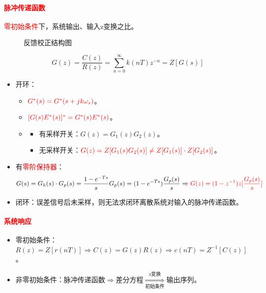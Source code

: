 \documentclass[
12pt, %
a4paper, 
oneside, %
]{scrartcl}
\begin{document}
\paragraph{\textcolor{red}{脉冲传递函数}}
\textcolor{red}{零初始条件}下，系统输出、输入z变换之比。

\begin{figure}[H]
\centering 
{}
\caption{反馈校正结构图}
\end{figure}
$$ G(z) = \frac{C(z)}{R(z)} = \sum_{n = 0}^{\infty} k(nT)z^{-n} = Z[G(s)] $$

\begin{itemize}
\item 开环：
\begin{itemize}
\item $ \textcolor{red}{G^*(s) = G^*(s + j k \omega_s)} $。
\item $ \textcolor{red}{[G(s)E^*(s)]^* = G^*(s) E^*(s)} $。
\item 
\begin{itemize}
\item 有采样开关：$ G(z) = G_1(z)G_2(z) $。
\item 无采样开关：$ \textcolor{red}{G(z) = Z[G_1(s) G_2(s)] \neq Z[G_1(s)] \cdot Z[G_2(s)]} $。
\end{itemize}
\end{itemize}
\item 有\textcolor{red}{零阶保持器}：
$$ G(s) = G_h(s) \cdot G_p(s) = \frac{1 - e^{-Ts}}{s} G_p(s) = (1 - e^{-Ts})\frac{G_p(s)}{s} \Rightarrow \textcolor{red}{G(z) = (1 - z^{-1})z[\frac{G_p(s)}{s}]} $$
\item 闭环：误差信号后未采样，则无法求闭环离散系统对输入的脉冲传递函数。
\end{itemize}
\paragraph{\textcolor{red}{系统响应}}
\begin{itemize}
\item 零初始条件：$ R(z) = Z[r(nT)] \Rightarrow C(z) = G(z)R(z) \Rightarrow c(nT) = Z^{-1}[C(z)] $。
\item 非零初始条件：脉冲传递函数$ \Rightarrow $差分方程$ \underset{\text{初始条件}}{\overset{\text{z变换}}{\Longrightarrow}} $输出序列。
\end{itemize}
\end{document}

